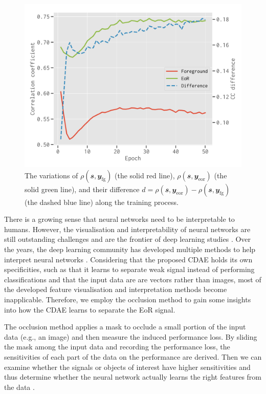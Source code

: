 \documentclass[fleqn,usenatbib]{mnras}
\newlength{\myfigwidth}
\newcommand{\R}[1]{\mathrm{#1}}
\newcommand{\B}[1]{\mathbfit{#1}}
\newcommand{\editwip}[1]{{\leavevmode\color{magenta}#1}}
\begin{document}
{\begin{figure}
  \centering
  \includegraphics[width=\myfigwidth]{occlusion-epoch}
  \caption{\label{fig:occ-epoch}\editwip{%
    The variations of $\rho(\B{s}, \B{y}_{\R{fg}})$ (the solid red line),
    $\rho(\B{s}, \B{y}_{\R{eor}})$ (the solid green line), and their difference
    $d = \rho(\B{s}, \B{y}_{\R{eor}}) - \rho(\B{s}, \B{y}_{\R{fg}})$
    (the dashed blue line) along the training process.
  }}
\end{figure}

There is a growing sense that neural networks need to be interpretable to
humans.
However, the visualisation and interpretability of neural networks are
still outstanding challenges and are the frontier of deep learning studies
\citep[see][for recent reviews]{olah2017,olah2018}.
Over the years, the deep learning community has developed multiple methods
to help interpret neural networks
\citep[e.g.,][]{simonyan2013,zeiler2014,mahendran2015,springenberg2015}.
Considering that the proposed CDAE holds its own specificities, such as
that it learns to separate weak signal instead of performing
classifications and that the input data are are vectors rather than images,
most of the developed feature visualisation and interpretation methods
become inapplicable.
Therefore, we employ the occlusion method \citep{zeiler2014} to gain some
insights into how the CDAE learns to separate the EoR signal.

The occlusion method applies a mask to occlude a small portion of the input
data (e.g., an image) and then measure the induced performance loss.
By sliding the mask among the input data and recording the performance
loss, the sensitivities of each part of the data on the performance are
derived.
Then we can examine whether the signals or objects of interest have higher
sensitivities and thus determine whether the neural network actually learns
the right features from the data \citep{zeiler2014}.

}
\end{document}
